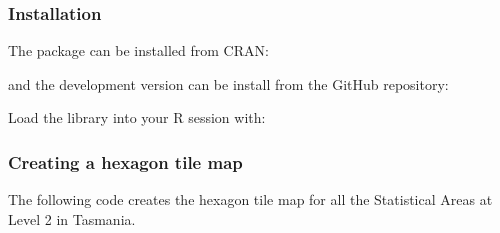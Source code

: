 \documentclass{monashthesis}
\begin{document}
\hypertarget{installation}{%
\subsubsection{Installation}\label{installation}}

The package can be installed from CRAN:

and the development version can be install from the GitHub repository:

Load the library into your R session with:

\hypertarget{creating-a-hexagon-tile-map}{%
\subsubsection{Creating a hexagon tile map}\label{creating-a-hexagon-tile-map}}

The following code creates the hexagon tile map for all the Statistical Areas at Level 2 in Tasmania.
\end{document}
